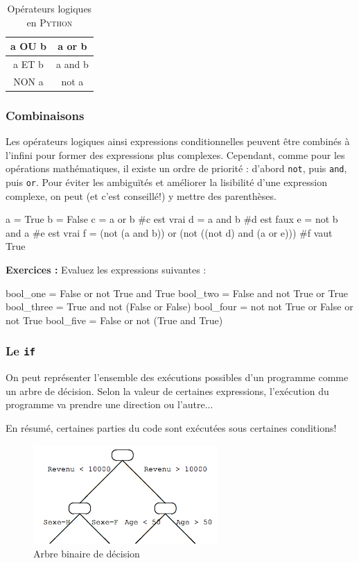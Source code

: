\begin{table}[!h]
    \centering
    \begin{tabular}{|c|c|}
        \hline
        a OU b & a or b\\
        \hline
        a ET b & a and b \\
        \hline
        NON a & not a \\
        \hline
    \end{tabular}
    \caption{Opérateurs logiques en \textsc{Python}}
\end{table}

\subsubsection{Combinaisons}
Les opérateurs logiques ainsi expressions conditionnelles peuvent être combinés à l'infini pour former des expressions plus complexes. Cependant, comme pour les opérations mathématiques, il existe un ordre de priorité : d'abord \texttt{not}, puis \texttt{and}, puis \texttt{or}. Pour éviter les ambiguïtés et améliorer la lisibilité d'une expression complexe, on peut (et c'est conseillé!) y mettre des parenthèses.

\begin{python}[caption = Expressions booléennes]
a = True
b = False
c = a or b #c est vrai
d = a and b #d est faux
e = not b and a #e est vrai
f = (not (a and b)) or (not ((not d) and (a or e))) #f vaut True
\end{python}
\textbf{Exercices : } Evaluez les expressions suivantes :
\begin{python}[caption = Exercices d'expressions booléennes]
bool_one = False or not True and True
bool_two = False and not True or True
bool_three = True and not (False or False)
bool_four = not not True or False or not True
bool_five = False or not (True and True)
\end{python}
\subsubsection{Le \texttt{if}}
On peut représenter l'ensemble des exécutions possibles d'un programme comme un arbre de décision. Selon la valeur de certaines expressions, l'exécution du programme va prendre une direction ou
l'autre...


En résumé, certaines parties du code sont exécutées sous
certaines conditions!

\begin{figure}[!h]
    \centering
    \includegraphics[width=7cm]{arbre.png}
    \caption{Arbre binaire de décision}
    \label{arbre}
\end{figure}

